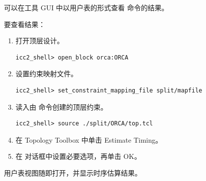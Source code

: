 可以在工具 GUI 中以用户表的形式查看  命令的结果。

要查看结果：
\begin{enumerate}
  \item 打开顶层设计。
\begin{lstlisting}
icc2_shell> open_block orca:ORCA
\end{lstlisting}
  \item 设置约束映射文件。
\begin{lstlisting}
icc2_shell> set_constraint_mapping_file split/mapfile
\end{lstlisting}
  \item 读入由  命令创建的顶层约束。
\begin{lstlisting}
icc2_shell> source ./split/ORCA/top.tcl
\end{lstlisting}
  \item 在 Topology Toolbox 中单击 Estimate Timing。
  \item 在  对话框中设置必要选项，再单击 OK。
\end{enumerate}

用户表视图随即打开，并显示时序估算结果。
